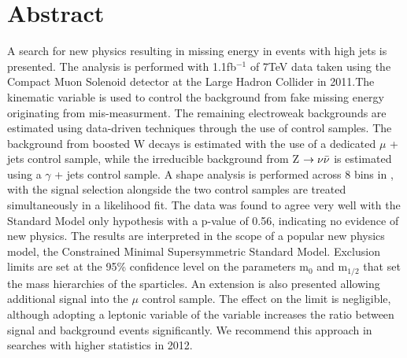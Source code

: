 \chapter*{Abstract}
\noindent 
\vspace{10mm}
\normalsize

A search for new physics resulting in missing energy in events with high \Pt jets is presented. The analysis is performed with 1.1fb$^{-1}$ of 7TeV data taken using the Compact Muon Solenoid detector at the Large Hadron Collider in 2011.The kinematic variable \alt is used to control the background from fake missing energy originating from mis-measurment. The remaining electroweak backgrounds are estimated using data-driven techniques through the use of control samples. The background from boosted W decays is estimated with the use of a dedicated $\mu$ + jets control sample, while the irreducible background from Z $\rightarrow \nu \bar{\nu}$ is estimated using a $\gamma$ + jets control sample.  A shape analysis is performed across 8 bins in \HT, with the signal selection alongside the two control samples are treated simultaneously in a likelihood fit.  The data was found to agree very well with the Standard Model only hypothesis with a p-value of 0.56, indicating no evidence of new physics. The results are interpreted in the scope of a popular new physics model, the Constrained Minimal Supersymmetric Standard Model. Exclusion limits are set at the 95\% confidence level on the parameters m$_{0}$ and m$_{1/2}$ that set the mass hierarchies of the sparticles. An extension is also presented allowing additional signal into the $\mu$ control sample. The effect on the limit is negligible, although adopting a leptonic variable of the \alt variable increases the ratio between signal and background events significantly. We recommend this approach in searches with higher statistics in 2012. 



